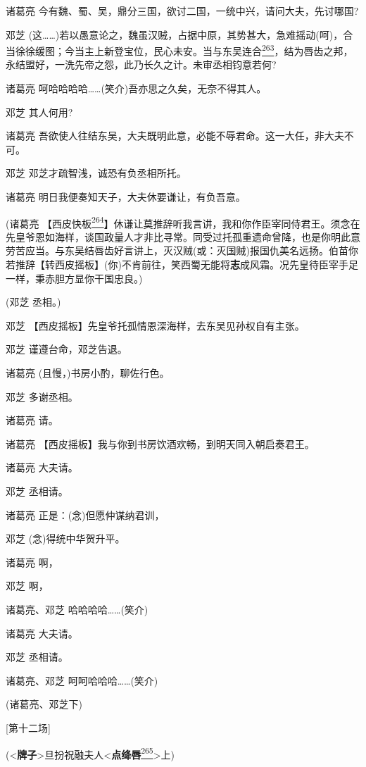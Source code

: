 诸葛亮 今有魏、蜀、吴，鼎分三国，欲讨二国，一统中兴，请问大夫，先讨哪国?

邓芝
(这\ldots{}\ldots{})若以愚意论之，魏虽汉贼，占据中原，其势甚大，急难摇动(呵)，合当徐徐缓图；今当主上新登宝位，民心未安。当与东吴连合\protect\hyperlink{fn263}{\textsuperscript{263}}，结为唇齿之邦，永结盟好，一洗先帝之怨，此乃长久之计。未审丞相钧意若何?

诸葛亮 呵哈哈哈哈\ldots{}\ldots{}(笑介)吾亦思之久矣，无奈不得其人。

邓芝 其人何用?

诸葛亮
吾欲使人往结东吴，大夫既明此意，必能不辱君命。这一大任，非大夫不可。

邓芝 邓芝才疏智浅，诚恐有负丞相所托。

诸葛亮 明日我便奏知天子，大夫休要谦让，有负吾意。

(诸葛亮
【西皮快板\protect\hyperlink{fn264}{\textsuperscript{264}}】休谦让莫推辞听我言讲，我和你作臣宰同侍君王。须念在先皇爷恩如海样，谈国政量人才非比寻常。同受过托孤重遗命曾降，也是你明此意劳苦应当。与东吴结唇齿好言讲上，灭汉贼(或：灭国贼)报国仇美名远扬。伯苗你若推辞【转西皮摇板】(你)不肯前往，笑西蜀无能将\textbf{志}成风霜。况先皇待臣宰手足一样，秉赤胆方显你干国忠良。)

(邓芝 丞相。)

邓芝 【西皮摇板】先皇爷托孤情恩深海样，去东吴见孙权自有主张。

邓芝 谨遵台命，邓芝告退。

诸葛亮 (且慢，)书房小酌，聊佐行色。

邓芝 多谢丞相。

诸葛亮 请。

诸葛亮 【西皮摇板】我与你到书房饮酒欢畅，到明天同入朝启奏君王。

诸葛亮 大夫请。

邓芝 丞相请。

诸葛亮 正是：(念)但愿仲谋纳君训，

邓芝 (念)得统中华贺升平。

诸葛亮 啊，

邓芝 啊，

诸葛亮、邓芝 哈哈哈哈\ldots{}\ldots{}(笑介)

诸葛亮 大夫请。

邓芝 丞相请。

诸葛亮、邓芝 呵呵哈哈哈\ldots{}\ldots{}(笑介)

(诸葛亮、邓芝下)

{[}第十二场{]}

(\textless{}\textbf{牌子}\textgreater{}旦扮祝融夫人\textless{}\textbf{点绛唇}\protect\hyperlink{fn265}{\textsuperscript{265}}\textgreater{}上)

